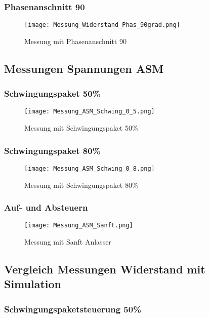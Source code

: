 \begin{appendix}
\subsubsection*{Phasenanschnitt 90\textdegree}
\begin{figure}[ht!]
	\centering
	\texttt{[image: Messung\_Widerstand\_Phas\_90grad.png]}	
	\caption{Messung mit Phasenanschnitt 90\textdegree}\label{fig:Mess_Phas_90}
\end{figure}

\newpage
\subsection{Messungen Spannungen ASM}\label{sec:Mess_Spannung_ASM}
\subsubsection*{Schwingungspaket 50\%}
\begin{figure}[ht!]
	\centering
	\texttt{[image: Messung\_ASM\_Schwing\_0\_5.png]}	
	\caption{Messung mit Schwingungspaket 50\%}\label{fig:Mess_ASM_Schwing_0_5}
\end{figure}

\newpage
\subsubsection*{Schwingungspaket 80\%}
\begin{figure}[ht!]
	\centering
	\texttt{[image: Messung\_ASM\_Schwing\_0\_8.png]}	
	\caption{Messung mit Schwingungspaket 80\%}\label{fig:Mess_ASM_Schwing_0_8}
\end{figure}

\newpage
\subsubsection*{Auf- und Absteuern}
\begin{figure}[ht!]
	\centering
	\texttt{[image: Messung\_ASM\_Sanft.png]}	
	\caption{Messung mit Sanft Anlasser}\label{fig:Mess_ASM_Sanft}
\end{figure}

\newpage
\subsection{Vergleich Messungen Widerstand mit Simulation}
\subsubsection*{Schwingungspaketsteuerung 50\%} \label{sec:Vergleich_Mess_Sim_Schwing_50}


\end{appendix}
